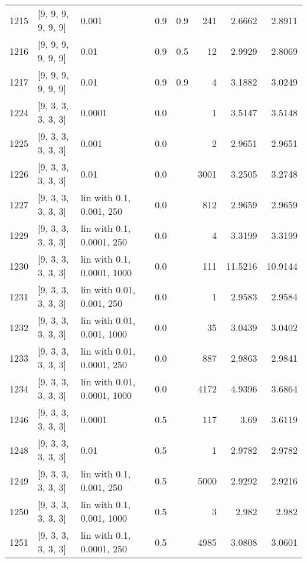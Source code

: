 \begin{longtable}{lllrrrrr}
 1215 & [9, 9, 9, 9, 9, 9] &                       0.001 &      0.9 & 0.9 &  241 &   2.6662 &   2.8911 \\
 1216 & [9, 9, 9, 9, 9, 9] &                        0.01 &      0.9 & 0.5 &   12 &   2.9929 &   2.8069 \\
 1217 & [9, 9, 9, 9, 9, 9] &                        0.01 &      0.9 & 0.9 &    4 &   3.1882 &   3.0249 \\
 1224 & [9, 3, 3, 3, 3, 3] &                      0.0001 &      0.0 &     &    1 &   3.5147 &   3.5148 \\
 1225 & [9, 3, 3, 3, 3, 3] &                       0.001 &      0.0 &     &    2 &   2.9651 &   2.9651 \\
 1226 & [9, 3, 3, 3, 3, 3] &                        0.01 &      0.0 &     & 3001 &   3.2505 &   3.2748 \\
 1227 & [9, 3, 3, 3, 3, 3] &    lin with 0.1, 0.001, 250 &      0.0 &     &  812 &   2.9659 &   2.9659 \\
 1229 & [9, 3, 3, 3, 3, 3] &   lin with 0.1, 0.0001, 250 &      0.0 &     &    4 &   3.3199 &   3.3199 \\
 1230 & [9, 3, 3, 3, 3, 3] &  lin with 0.1, 0.0001, 1000 &      0.0 &     &  111 &  11.5216 &  10.9144 \\
 1231 & [9, 3, 3, 3, 3, 3] &   lin with 0.01, 0.001, 250 &      0.0 &     &    1 &   2.9583 &   2.9584 \\
 1232 & [9, 3, 3, 3, 3, 3] &  lin with 0.01, 0.001, 1000 &      0.0 &     &   35 &   3.0439 &   3.0402 \\
 1233 & [9, 3, 3, 3, 3, 3] &  lin with 0.01, 0.0001, 250 &      0.0 &     &  887 &   2.9863 &   2.9841 \\
 1234 & [9, 3, 3, 3, 3, 3] & lin with 0.01, 0.0001, 1000 &      0.0 &     & 4172 &   4.9396 &   3.6864 \\
 1246 & [9, 3, 3, 3, 3, 3] &                      0.0001 &      0.5 &     &  117 &     3.69 &   3.6119 \\
 1248 & [9, 3, 3, 3, 3, 3] &                        0.01 &      0.5 &     &    1 &   2.9782 &   2.9782 \\
 1249 & [9, 3, 3, 3, 3, 3] &    lin with 0.1, 0.001, 250 &      0.5 &     & 5000 &   2.9292 &   2.9216 \\
 1250 & [9, 3, 3, 3, 3, 3] &   lin with 0.1, 0.001, 1000 &      0.5 &     &    3 &    2.982 &    2.982 \\
 1251 & [9, 3, 3, 3, 3, 3] &   lin with 0.1, 0.0001, 250 &      0.5 &     & 4985 &   3.0808 &   3.0601 \\

\end{longtable}
